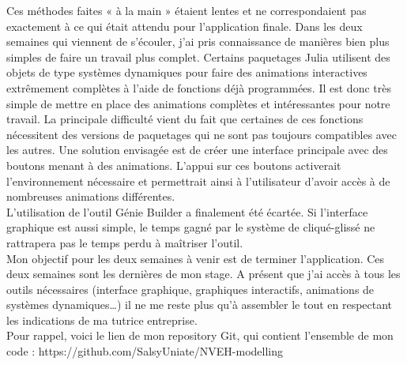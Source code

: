 \documentclass[a4paper, french, 12pt, titlepage]{article}
\begin{document}
Ces méthodes faites « à la main » étaient lentes et ne correspondaient pas exactement à ce qui était attendu pour l'application finale. Dans les deux semaines qui viennent de s'écouler, j'ai pris connaissance de manières bien plus simples de faire un travail plus complet. Certains paquetages Julia utilisent des objets de type systèmes dynamiques pour faire des animations interactives extrêmement complètes à l'aide de fonctions déjà programmées. Il est donc très simple de mettre en place des animations complètes et intéressantes pour notre travail. La principale difficulté vient du fait que certaines de ces fonctions nécessitent des versions de paquetages qui ne sont pas toujours compatibles avec les autres. Une solution envisagée est de créer une interface principale avec des boutons menant à des animations. L'appui sur ces boutons activerait l'environnement nécessaire et permettrait ainsi à l'utilisateur d'avoir accès à de nombreuses animations différentes. \\

L'utilisation de l'outil Génie Builder a finalement été écartée. Si l'interface graphique est aussi simple, le temps gagné par le système de cliqué-glissé ne rattrapera pas le temps perdu à maîtriser l'outil. \\

Mon objectif pour les deux semaines à venir est de terminer l'application. Ces deux semaines sont les dernières de mon stage. A présent que j'ai accès à tous les outils nécessaires (interface graphique, graphiques interactifs, animations de systèmes dynamiques…) il ne me reste plus qu'à assembler le tout en respectant les indications de ma tutrice entreprise.\\

Pour rappel, voici le lien de mon repository Git, qui contient l'ensemble de mon code : https://github.com/SalsyUniate/NVEH-modelling
\end{document}
